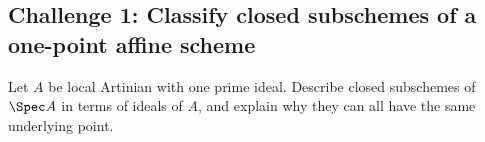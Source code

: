 \subsection*{Challenge 1: Classify closed subschemes of a one-point affine scheme}
\begin{problem}\label{chal:vi22-01}
Let $A$ be local Artinian with one prime ideal.  Describe closed subschemes of $\Spec A$ in terms of ideals of $A$, and explain why they can all have the same underlying point.
\end{problem}
